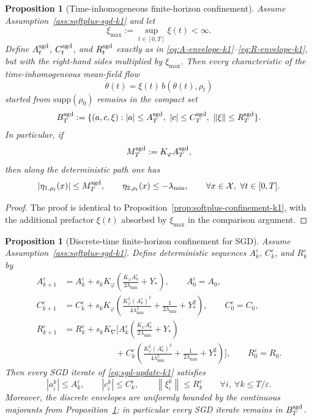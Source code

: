 \documentclass[11pt]{article}
\newtheorem{proposition}[theorem]{Proposition}
\theoremstyle{definition}
\newcommand{\supp}{\mathrm{supp}}
\newcommand{\norm}[1]{\left\lVert #1 \right\rVert}
\newcommand{\mc}[1]{\mathcal{#1}}
\begin{document}
\begin{proposition}[Time-inhomogeneous finite-horizon confinement]
\label{prop:sgd-confinement-k1}
Assume Assumption~\ref{ass:softplus-sgd-k1} and let
\[
  \xi_{\max}:=\sup_{t\in[0,T]}\xi(t)<\infty.
\]
Define $A_t^{\rm sgd}$, $C_t^{\rm sgd}$, and $R_t^{\rm sgd}$ exactly as in
\eqref{eq:A-envelope-k1}--\eqref{eq:R-envelope-k1}, but with the right-hand
sides multiplied by $\xi_{\max}$. Then every characteristic of the
time-inhomogeneous mean-field flow
\[
  \dot\theta(t)=\xi(t)\,b(\theta(t),\rho_t)
\]
started from $\supp(\rho_0)$ remains in the compact set
\[
  B_T^{\rm sgd}
  :=
  \{(a,c,\xi): |a|\le A_T^{\rm sgd},\ |c|\le C_T^{\rm sgd},\ \norm{\xi}\le R_T^{\rm sgd}\}.
\]
In particular, if
\[
  M_T^{\rm sgd}:=K_\varphi A_T^{\rm sgd},
\]
then along the deterministic path one has
\[
  |\eta_{1,\rho_t}(x)|\le M_T^{\rm sgd},
  \qquad
  \eta_{2,\rho_t}(x)\le -\lambda_{\min},
  \qquad
  \forall x\in\mc{X},\ \forall t\in[0,T].
\]
\end{proposition}

\begin{proof}
The proof is identical to Proposition~\ref{prop:softplus-confinement-k1}, with
the additional prefactor $\xi(t)$ absorbed by $\xi_{\max}$ in the comparison
argument.
\end{proof}

\begin{proposition}[Discrete-time finite-horizon confinement for SGD]
\label{prop:sgd-discrete-confinement-k1}
Assume Assumption~\ref{ass:softplus-sgd-k1}. Define deterministic sequences
$A_k^\varepsilon$, $C_k^\varepsilon$, and $R_k^\varepsilon$ by
\begin{align}
  A_{k+1}^\varepsilon
  &=
  A_k^\varepsilon
  +
  s_k K_\varphi
  \left(
    \frac{K_\varphi A_k^\varepsilon}{2\lambda_{\min}}+Y_\ast
  \right),
  \qquad
  A_0^\varepsilon=A_0,
  \label{eq:discrete-A-envelope-k1}
  \\
  C_{k+1}^\varepsilon
  &=
  C_k^\varepsilon
  +
  s_k K_\varphi
  \left(
    \frac{K_\varphi^2 (A_k^\varepsilon)^2}{4\lambda_{\min}^2}
    +
    \frac{1}{2\lambda_{\min}}
    +
    Y_\ast^2
  \right),
  \qquad
  C_0^\varepsilon=C_0,
  \label{eq:discrete-C-envelope-k1}
  \\
  R_{k+1}^\varepsilon
  &=
  R_k^\varepsilon
  +
  s_k K_{\nabla}
  \Biggl[
    A_k^\varepsilon
    \left(
      \frac{K_\varphi A_k^\varepsilon}{2\lambda_{\min}}+Y_\ast
    \right)
    \nonumber\\
  &\qquad\qquad\qquad
    +
    C_k^\varepsilon
    \left(
      \frac{K_\varphi^2 (A_k^\varepsilon)^2}{4\lambda_{\min}^2}
      +
      \frac{1}{2\lambda_{\min}}
      +
      Y_\ast^2
    \right)
  \Biggr],
  \qquad
  R_0^\varepsilon=R_0.
  \label{eq:discrete-R-envelope-k1}
\end{align}
Then every SGD iterate of \eqref{eq:sgd-update-k1} satisfies
\[
  |a_i^k|\le A_k^\varepsilon,
  \qquad
  |c_i^k|\le C_k^\varepsilon,
  \qquad
  \norm{\xi_i^k}\le R_k^\varepsilon
  \qquad
  \forall i,\ \forall k\le T/\varepsilon.
\]
Moreover, the discrete envelopes are uniformly bounded by the continuous
majorants from Proposition~\ref{prop:sgd-confinement-k1}; in particular every
SGD iterate remains in $B_T^{\rm sgd}$.
\end{proposition}
\end{document}
